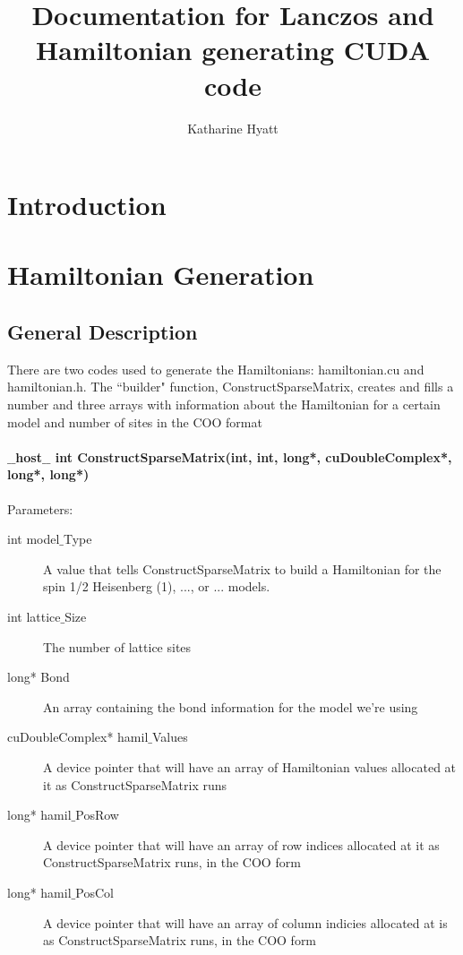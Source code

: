 \documentclass{article}
\author{Katharine Hyatt}
\title{Documentation for Lanczos and Hamiltonian generating CUDA code}
\begin{document}
\maketitle

\section{Introduction}

\section{Hamiltonian Generation}

\subsection{General Description}

There are two codes used to generate the Hamiltonians: hamiltonian.cu and hamiltonian.h. The ``builder" function, ConstructSparseMatrix, creates and fills a number and three arrays with information about the Hamiltonian for a certain model and number of sites in the COO format

\paragraph{$\_\_$host$\_\_$ int ConstructSparseMatrix(int, int, long*, cuDoubleComplex*, long*, long*)}

Parameters:
\begin{description}
\item[int model$\_$Type] A value that tells ConstructSparseMatrix to build a Hamiltonian for the spin 1/2 Heisenberg (1), ..., or ... models.
\item[int lattice$\_$Size] The number of lattice sites
\item[long* Bond] An array containing the bond information for the model we're using 
\item[cuDoubleComplex* hamil$\_$Values] A device pointer that will have an array of Hamiltonian values allocated at it as ConstructSparseMatrix runs
\item[long* hamil$\_$PosRow] A device pointer that will have an array of row indices allocated at it as ConstructSparseMatrix runs, in the COO form
\item[long* hamil$\_$PosCol] A device pointer that will have an array of column indicies allocated at is as ConstructSparseMatrix runs, in the COO form
\end{description}
\end{document}
